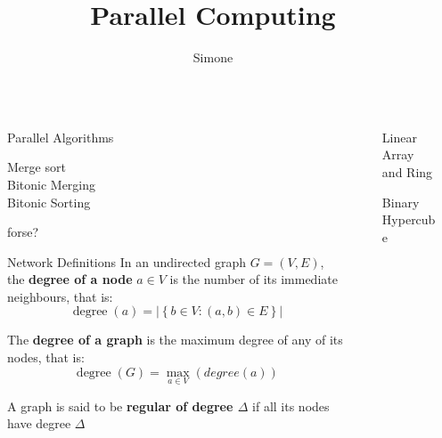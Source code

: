 \documentclass[final]{beamer}
\title{Parallel Computing}
\author{Simone}
\institute[shortinst]{UNIPD}
\newlength{\sepwidth}
\newlength{\colwidth}
\newcommand{\separatorcolumn}{\begin{column}{\sepwidth}\end{column}}
\begin{document}
    \begin{frame}[t]
        \begin{columns}[t]
            \separatorcolumn
            \begin{column}{\colwidth}
                \begin{block}{Parallel Algorithms}
                    \begin{description}
                        \item[Merge sort]  
                        \item[Bitonic Merging]  
                        \item[Bitonic Sorting] 
                    \end{description}

                     forse?

                \end{block}
                \begin{block}{Network Definitions}
                        In an undirected graph \(G = (V, E)\), the \textbf{degree of a node} \(a \in V\) is the number of its immediate neighbours, that is:
                        \begin{equation*}
                            \operatorname{degree}(a) = \left| \left\{ b \in V : (a,b) \in E \right\} \right|
                        \end{equation*}

                        The \textbf{degree of a graph} is the maximum degree of any of its nodes, that is:
                        \begin{equation*}
                            \operatorname{degree}(G) = \max_{a \in V} (degree(a))
                        \end{equation*}

                        A graph is said to be \textbf{regular of degree \(\Delta\) } if all its nodes have degree \(\Delta\)


                \end{block}
            \end{column}
            \separatorcolumn
            \begin{column}{\colwidth}
                \begin{block}{Linear Array and Ring}
                \end{block}
                \begin{block}{Binary Hypercube}
                    

\end{block}
\end{column}
\end{columns}
\end{frame}
\end{document}
